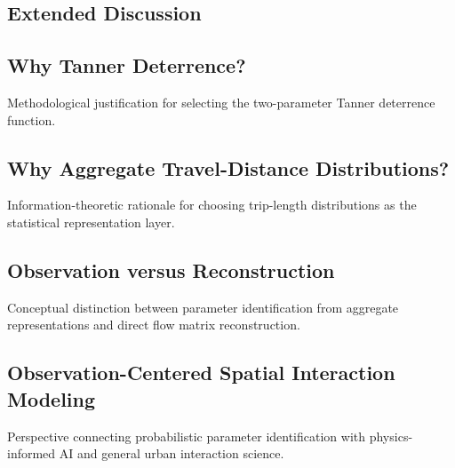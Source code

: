 \documentclass[pdflatex,sn-basic,iicol]{sn-jnl}
\begin{document}
\begin{appendices}
\section{Extended Discussion}\label{app:extended_discussion}
\subsection{Why Tanner Deterrence?}
Methodological justification for selecting the two-parameter Tanner deterrence function.

\subsection{Why Aggregate Travel-Distance Distributions?}
Information-theoretic rationale for choosing trip-length distributions as the statistical representation layer.

\subsection{Observation versus Reconstruction}
Conceptual distinction between parameter identification from aggregate representations and direct flow matrix reconstruction.

\subsection{Observation-Centered Spatial Interaction Modeling}
Perspective connecting probabilistic parameter identification with physics-informed AI and general urban interaction science.

\end{appendices}

\end{document}
